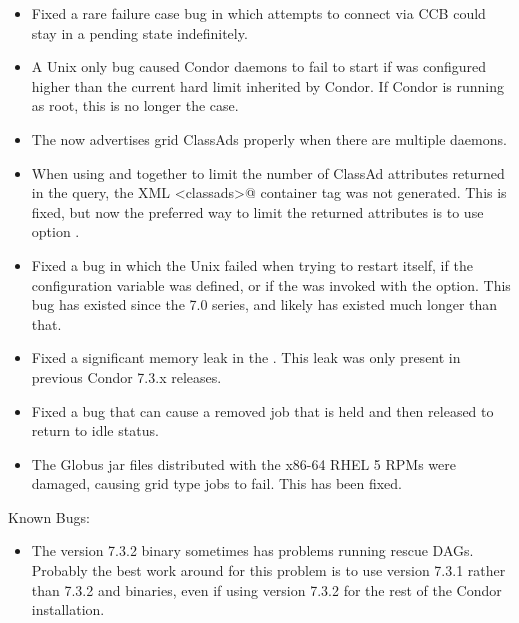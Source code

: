 \begin{itemize}
\item Fixed a rare failure case bug in which attempts to connect via
CCB could stay in a pending state indefinitely.

\item A Unix only bug caused Condor daemons to fail to start if
 was configured higher
than the current hard limit inherited by Condor.  If Condor is running
as root, this is no longer the case.

\item The  now advertises grid ClassAds properly when there
are multiple  daemons.

\item When using   and  together to
limit the number of ClassAd attributes returned in the query, the XML
\verb@<classads>@ container tag was not generated.  This is fixed, but
now the preferred way to limit the returned attributes is to
use  option .

\item Fixed a bug in which the Unix  failed
when trying to restart itself,
if the configuration variable  was defined,
or if the  was invoked with the  option.
This bug has existed since the 7.0 series,
and likely has existed much longer than that.

\item Fixed a significant memory leak in the . This
leak was only present in previous Condor 7.3.x releases.

\item Fixed a bug that can cause a removed job that is held and then
released to return to idle status.

\item The Globus jar files distributed with the x86-64 RHEL 5 RPMs were
damaged, causing  grid type jobs to fail. This has been fixed.

\end{itemize}

\noindent Known Bugs:

\begin{itemize}

\item The version 7.3.2  binary sometimes has problems running
rescue DAGs.  Probably the best work around for this problem is to use
version 7.3.1 rather than 7.3.2  and 
binaries, even if using version 7.3.2 for the rest of the Condor
installation.

\end{itemize}

